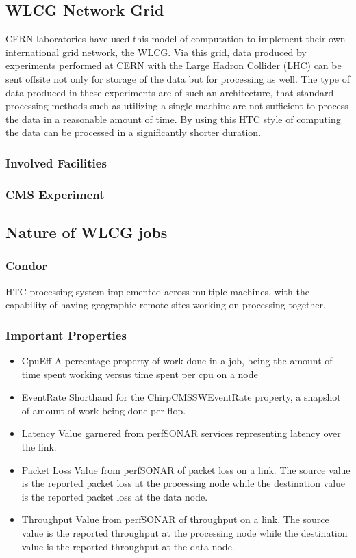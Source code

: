 \documentclass[]{scrartcl}
\begin{document}
\subsection{WLCG Network Grid}
CERN laboratories have used this model of computation to implement their own international grid network, the WLCG. Via this grid, data produced by experiments performed at CERN with the Large Hadron Collider (LHC) can be sent offsite not only for storage of the data but for processing as well. The type of data produced in these experiments are of such an architecture, that standard processing methods such as utilizing a single machine are not sufficient to process the data in a reasonable amount of time. By using this HTC style of computing the data can be processed in a significantly shorter duration.
\subsubsection{Involved Facilities}
\subsubsection{CMS Experiment}
\subsection{Nature of WLCG jobs}
\subsubsection{Condor}
HTC processing system implemented across multiple machines, with the capability of having geographic remote sites working on processing together.
\subsubsection{Important Properties}
\begin{itemize}
	\item CpuEff
	\subitem A percentage property of work done in a job, being the amount of time spent working versus time spent per cpu on a node
	\item EventRate
	\subitem Shorthand for the ChirpCMSSWEventRate property, a snapshot of amount of work being done per flop.
	\item Latency
	\subitem Value garnered from perfSONAR services representing latency over the link. 
	\item Packet Loss
	\subitem Value from perfSONAR of packet loss on a link. The source value is the reported packet loss at the processing node while the destination value is the reported packet loss at the data node.
	\item Throughput
	\subitem Value from perfSONAR of throughput on a link. The source value is the reported throughput at the processing node while the destination value is the reported throughput at the data node.
\end{itemize}
\end{document}
